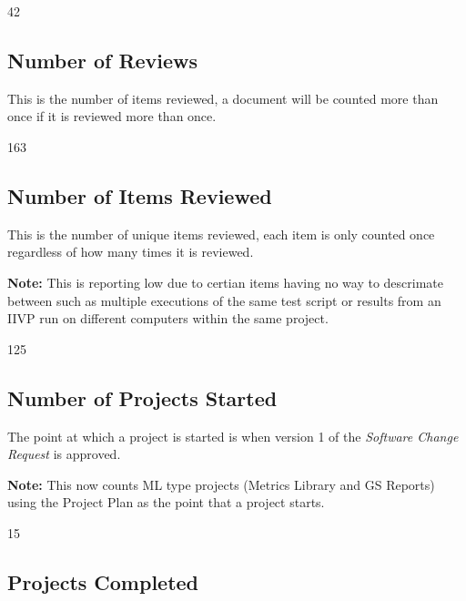 \documentclass{article}
\begin{document}
\begin{Schunk}
\begin{Soutput}
[1] 42
\end{Soutput}
\end{Schunk}

\subsection{Number of Reviews}
This is the number of items reviewed, a document will be counted more than once
if it is reviewed more than once.

\begin{Schunk}
\begin{Soutput}
[1] 163
\end{Soutput}
\end{Schunk}

\subsection{Number of Items Reviewed}
This is the number of unique items reviewed, each item is only counted once
regardless of how many times it is reviewed.

\textbf{Note:} This is reporting low due to certian items having no way to
descrimate between such as multiple executions of the same test script or
results from an IIVP run on different computers within the same project.

\begin{Schunk}
\begin{Soutput}
[1] 125
\end{Soutput}
\end{Schunk}

\subsection{Number of Projects Started}
The point at which a project is started is when version 1 of the \textit{Software
Change Request} is approved.

\textbf{Note:} This now counts ML type projects (Metrics Library and GS Reports)
using the Project Plan as the point that a project starts.

\begin{Schunk}
\begin{Soutput}
[1] 15
\end{Soutput}
\end{Schunk}

\subsection{Projects Completed}
\end{document}
